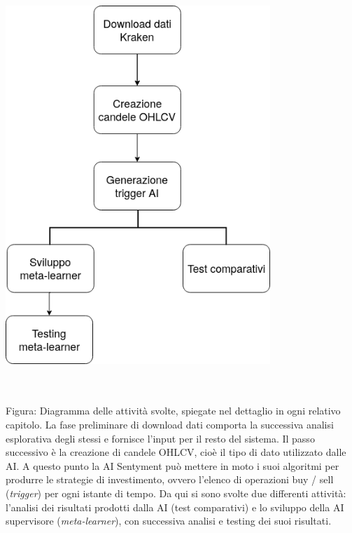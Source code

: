 \documentclass[a4paper,12pt]{report}
\begin{document}
\\~\\
\begin{fig}
	\begin{center}
		\includegraphics[width=10cm]{flowchart}
	\end{center}
	\caption{\\~\\Figura: Diagramma delle attività svolte, spiegate nel dettaglio in ogni relativo capitolo. La fase preliminare di download dati comporta la successiva analisi esplorativa degli stessi e fornisce l'input per il resto del sistema. Il passo successivo è la creazione di candele OHLCV, cioè il tipo di dato utilizzato dalle AI. A questo punto la AI Sentyment può mettere in moto i suoi algoritmi per produrre le strategie di investimento, ovvero l'elenco di operazioni buy / sell (\textit{trigger}) per ogni istante di tempo. Da qui si sono svolte due differenti attività: l'analisi dei risultati prodotti dalla AI (test comparativi) e lo sviluppo della AI supervisore (\textit{meta-learner}), con successiva analisi e testing dei suoi risultati.}
\end{fig}



\newpage
\end{document}
